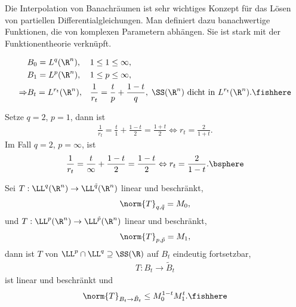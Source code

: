 Die Interpolation von Banachräumen ist sehr wichtiges Konzept für das Lösen von
partiellen Differentialgleichungen. Man definiert dazu banachwertige
Funktionen, die von komplexen Parametern abhängen. Sie ist stark mit der
Funktionentheorie verknüpft.

\begin{prop}
\label{prop:2.40}
\begin{align*}
&B_0 = L^q(\R^n), && 1\le 1\le \infty,\\
&B_1 = L^p(\R^n), && 1\le p\le \infty,\\
\Rightarrow & B_t = L^{r_t}(\R^n), &&
\frac{1}{r_t} = \frac{t}{p} + \frac{1-t}{q},\; \SS(\R^n)\text{ dicht in
}L^{r_t}(\R^n).\fishhere
\end{align*}
\end{prop}

\begin{bspn}
Setze $q=2$, $p=1$, dann ist
\begin{align*}
\frac{1}{r_t} = \frac{t}{1}+\frac{1-t}{2} = \frac{1+t}{2} \Leftrightarrow r_t =
\frac{2}{1+t}.
\end{align*}
Im Fall $q=2$, $p=\infty$, ist
\begin{align*}
\frac{1}{r_t} = \frac{t}{\infty} + \frac{1-t}{2} = \frac{1-t}{2}
\Leftrightarrow r_t = \frac{2}{1-t}.\bsphere
\end{align*}
\end{bspn}

\begin{prop}
\label{prop:2.41}
Sei $T: \LL^q(\R^n) \to \LL^{\tilde{q}}(\R^n)$ linear und beschränkt,
\begin{align*}
\norm{T}_{q,\tilde{q}} = M_0,
\end{align*}
und $T: \LL^p(\R^n) \to \LL^{\tilde{p}}(\R^n)$ linear und beschränkt,
\begin{align*}
\norm{T}_{p,\tilde{p}} = M_1,
\end{align*}
dann ist $T$ von $\LL^p\cap \LL^q\supseteq \SS(\R)$ auf $B_t$ eindeutig
fortsetzbar,
\begin{align*}
T: B_t \to \tilde{B}_t
\end{align*}
ist linear und beschränkt und
\begin{align*}
\norm{T}_{B_t\to \tilde{B}_t} \le M_0^{1-t}M_1^t.\fishhere
\end{align*}
\end{prop}


